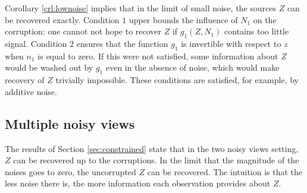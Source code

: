 %	

Corollary \ref{crl:lownoise} implies that in the limit of small noise, the sources $Z$ can be recovered exactly.
Condition $1$ upper bounds the influence of $N_1$ on the corruption: one cannot not hope to recover $Z$ if $g_1(Z, N_1)$ contains too little signal.
Condition $2$ ensures that the function $g_1$ is invertible with respect to $z$ when $n_1$ is equal to zero.
If this were not satisfied, some information about $Z$ would be washed out by $g_1$ even in the absence of noise, which would make recovery of $Z$ trivially impossible.
These conditions are satisfied, for example, by additive noise.


\subsection{Multiple noisy views}
\label{sec:multiple}

The results of Section \ref{sec:constrained} state that in the two noisy views setting, $Z$ can be recovered up to the corruptions.
In the limit that the magnitude of the noises goes to zero, the uncorrupted $Z$ can be recovered.
The intuition is that the less noise there is, the more information each observation provides about $Z$.

